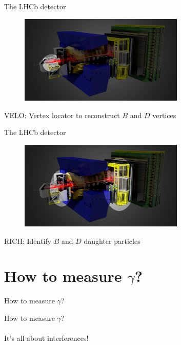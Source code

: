 \documentclass[dvipsnames]{beamer}
\begin{document}
\begin{frame}{The LHCb detector}
  \begin{figure}
    \centering
    \includegraphics[width = 0.7\textwidth]{Plots/LHCbDetector_VELO.png}
  \end{figure}
  \begin{center}
    \Large VELO: Vertex locator to reconstruct $B$ and $D$ vertices\phantom{y}
  \end{center}
\end{frame}

\begin{frame}{The LHCb detector}
  \begin{figure}
    \centering
    \includegraphics[width = 0.7\textwidth]{Plots/LHCbDetector_RICH.png}
  \end{figure}
  \begin{center}
    \Large RICH: Identify $B$ and $D$ daughter particles
  \end{center}
\end{frame}

\section{How to measure \texorpdfstring{$\gamma$}{gamma}?}
\begin{frame}{How to measure $\gamma$?}
  \begin{center}
    {\huge How to measure $\gamma$?}\\~\\
    {\large It's all about interferences!}
  \end{center}
\end{frame}
\end{document}
